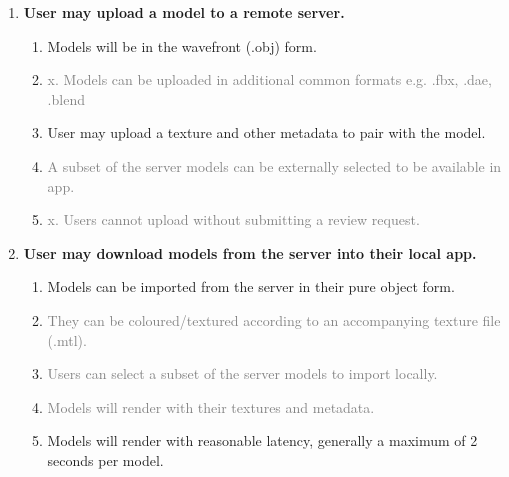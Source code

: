 \documentclass{article}
\newcommand{\light}[1]{\textcolor{gray}{#1}}
\begin{document}
\begin{enumerate}[label=(\Alph*)]
\item \textbf{User may upload a model to a remote server.}
    \begin{enumerate}[label=\arabic*.]
    \item Models will be in the wavefront (.obj) form.
    \item \light{x. Models can be uploaded in additional common formats e.g. .fbx, .dae, .blend}
    \item User may upload a texture and other metadata to pair with the model.
    \item \light{A subset of the server models can be externally selected to be available in app.}
    \item \light{x. Users cannot upload without submitting a review request.}
    \end{enumerate}
    
\item \textbf{User may download models from the server into their local app.}
    \begin{enumerate}[label=\arabic*.]
    \item Models can be imported from the server in their pure object form.
    \item \light{They can be coloured/textured according to an accompanying texture file (.mtl).}
    \item \light{Users can select a subset of the server models to import locally.}
    \item \light{Models will render with their textures and metadata.}
    \item Models will render with reasonable latency, generally a maximum of 2 seconds per model.
    \end{enumerate}


\end{enumerate}
\end{document}
